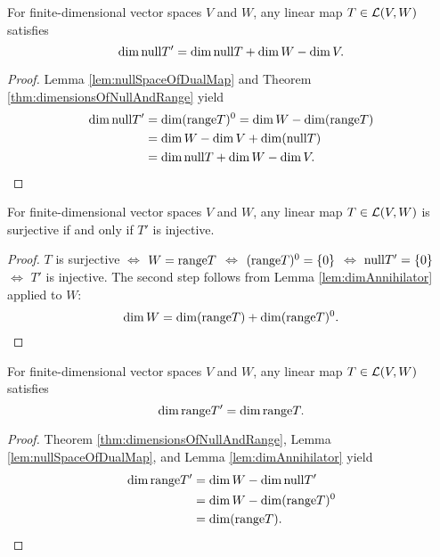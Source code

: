\begin{lem}
  \label{lem:nullSpaceOfDualMap3parts}
  For finite-dimensional vector spaces $V$ and $W$,
   any linear map $T\in {\cal L}(V, W)$
   satisfies
   \begin{equation}
     \label{eq:nullSpaceOfDualMap3parts}
     \dim \mathrm{null} T' = \dim \mathrm{null} T + \dim W -\dim V.
   \end{equation}
\end{lem}
\begin{proof}
  Lemma \ref{lem:nullSpaceOfDualMap} and 
  Theorem \ref{thm:dimensionsOfNullAndRange}
  yield
  \begin{align*}
    \dim \mathrm{null} T' &= \dim (\mathrm{range} T)^0
    = \dim W - \dim (\mathrm{range} T)
    \\
    &= \dim W - \dim V + \dim (\mathrm{null} T)
    \\
    &=\dim \mathrm{null} T + \dim W -\dim V.
      \qedhere
  \end{align*}
\end{proof}

\begin{coro}
  \label{coro:Tsurjective2dualTinjective}
  For finite-dimensional vector spaces $V$ and $W$,
   any linear map $T\in {\cal L}(V, W)$
   is surjective if and only if
   $T'$ is injective.
\end{coro}
\begin{proof}
  $T$ is surjective $\Leftrightarrow$ $W=\mathrm{range} T$
  $\Leftrightarrow$ $(\mathrm{range} T)^0 = \{0\}$
  $\Leftrightarrow$ $\mathrm{null} T' = \{0\}$
  $\Leftrightarrow$ $T'$ is injective.
  The second step follows from 
   Lemma \ref{lem:dimAnnihilator} applied to $W$: 
   \begin{displaymath}
     \dim W =\dim (\mathrm{range} T) + \dim (\mathrm{range} T)^0.
     \qedhere
   \end{displaymath}
\end{proof}

\begin{lem}
  \label{lem:dimRangeOfDualMap}
  For finite-dimensional vector spaces $V$ and $W$,
   any linear map $T\in {\cal L}(V, W)$ satisfies
  \begin{equation}
    \label{eq:dimRangeOfDualMap}
    \dim \mathrm{range} T' = \dim \mathrm{range} T.
  \end{equation}
\end{lem}
\begin{proof}
  Theorem \ref{thm:dimensionsOfNullAndRange}, 
  Lemma \ref{lem:nullSpaceOfDualMap},
  and Lemma \ref{lem:dimAnnihilator}
  yield
  \begin{align*}
    \dim \mathrm{range} T' &= \dim W - \dim \mathrm{null} T' 
                     \\
                    &= \dim W - \dim (\mathrm{range} T)^0
    \\
                   &= \dim (\mathrm{range} T).
      \qedhere
  \end{align*}
\end{proof}

